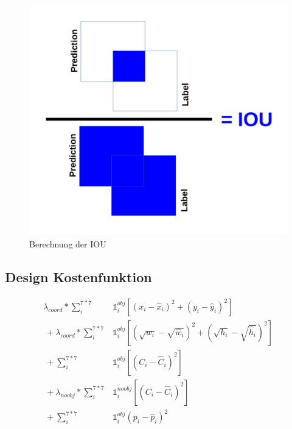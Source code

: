 \begin{figure}	
	\centering
	\includegraphics[width=.7\textwidth]{Kapitel/50Kostenfunktion/Bilder/IOU.pdf}
	\caption{Berechnung der IOU}
	\label{img:IOU}
\end{figure} 


\subsection{Design Kostenfunktion}
\begin{eqfloat}
\begin{equation}
\begin{split}
	\lambda_{coord} * \sum_{i}^{7*7}& \mathds{1}_{i}^{obj}[(x_{i}-\hat{x}_i)^{2} + (y_{i}-\hat{y}_i)^{2}] \\\
	+ \lambda_{coord} * \sum_{i}^{7*7}& \mathds{1}_{i}^{obj}[(\sqrt{w_{i}}-\sqrt{\hat{w}_{i}})^{2}+(\sqrt{h_{i}}-\sqrt{\hat{h}_{i}})^{2}] \\\
	+ \sum_{i}^{7*7}& \mathds{1}_{i}^{obj}[(C_{i} - \hat{C}_{i})^{2}] \\\
	+ \lambda_{noobj} * \sum_{i}^{7*7}& \mathds{1}_{i}^{noobj} [(C_{i} - \hat{C}_{i})^{2}] \\\
	+ \sum_{i}^{7*7}&\mathds{1}_{i}^{obj} (p_{i}-\hat{p}_{i})^{2}
\end{split} 
\end{equation}
\caption{abgespeckte Kostenfunktion wie Sie in dieser Arbeit verwendet wurde.}
\label{eq:Kostenfunktion}
\end{eqfloat}


